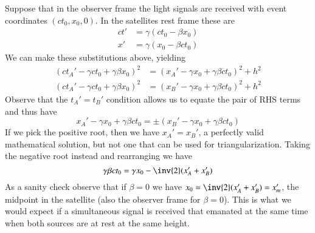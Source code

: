 {Suppose that in the observer frame the light signals are received with event coordinates \((c t_0, x_0, 0)\).  In the satellites rest frame these are
%
\begin{equation}\label{eqn:relElectroDynProblemSet1:1240}
\begin{aligned}
ct' &= \gamma ( c t_0 - \beta x_0 ) \\
x' &= \gamma ( x_0 - \beta c t_0 )
\end{aligned}
\end{equation}
%
We can make these substitutions above, yielding
%
\begin{equation}\label{eqn:relElectroDynProblemSet1:1260}
\begin{aligned}
( c t_A' - \gamma c t_0 + \gamma \beta x_0)^2 &= (x_A' - \gamma x_0 + \gamma \beta c t_0 )^2 + h^2 \\
( c t_A' - \gamma c t_0 + \gamma \beta x_0)^2 &= (x_B' - \gamma x_0 + \gamma \beta c t_0 )^2 + h^2
\end{aligned}
\end{equation}
%
Observe that the \(t_A' = t_B'\) condition allows us to equate the pair of RHS terms and thus have
%
\begin{equation}\label{eqn:relElectroDynProblemSet1:1280}
x_A' - \gamma x_0 + \gamma \beta c t_0 = \pm (x_B' - \gamma x_0 + \gamma \beta c t_0 )
\end{equation}
%
If we pick the positive root, then we have \(x_A' = x_B'\), a perfectly valid mathematical solution, but not one that can be used for triangularization.  Taking the negative root instead and rearranging we have
%
\begin{equation}\label{eqn:relElectroDynProblemSet1:1301}
\gamma \beta c t_0 = \gamma x_0 - \inv{2}(x_A' + x_B')
\end{equation}
%
As a sanity check observe that if \(\beta = 0\) we have \(x_0 = \inv{2}(x_A' + x_B') = x_m'\), the midpoint in the satellite (also the observer frame for \(\beta = 0\)).  This is what we would expect if a simultaneous signal is received that emanated at the same time when both sources are at rest at the same height.

}
